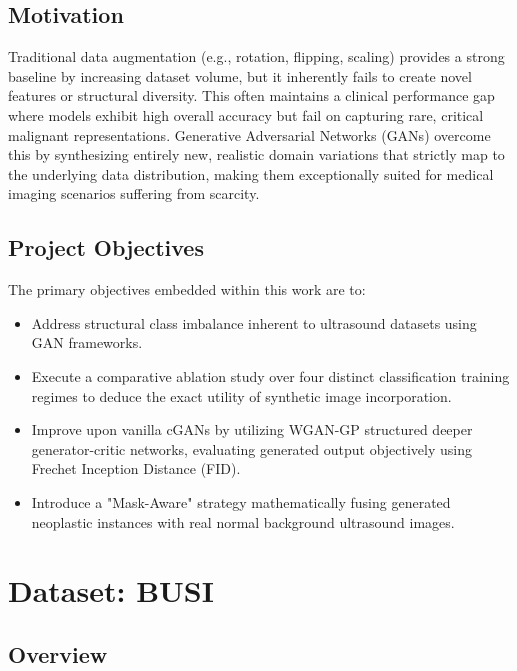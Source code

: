 \documentclass[12pt,a4paper]{article}
\begin{document}
\subsection{Motivation}
Traditional data augmentation (e.g., rotation, flipping, scaling) provides a strong baseline by increasing dataset volume, but it inherently fails to create novel features or structural diversity. This often maintains a clinical performance gap where models exhibit high overall accuracy but fail on capturing rare, critical malignant representations. Generative Adversarial Networks (GANs) overcome this by synthesizing entirely new, realistic domain variations that strictly map to the underlying data distribution, making them exceptionally suited for medical imaging scenarios suffering from scarcity.

\subsection{Project Objectives}

The primary objectives embedded within this work are to:
\begin{itemize}[leftmargin=2em]
    \item Address structural class imbalance inherent to ultrasound datasets using GAN frameworks.
    \item Execute a comparative ablation study over four distinct classification training regimes to deduce the exact utility of synthetic image incorporation. 
    \item Improve upon vanilla cGANs by utilizing WGAN-GP structured deeper generator-critic networks, evaluating generated output objectively using Frechet Inception Distance (FID).
    \item Introduce a "Mask-Aware" strategy mathematically fusing generated neoplastic instances with real normal background ultrasound images.
\end{itemize}



\section{Dataset: BUSI}

\subsection{Overview}
\end{document}
